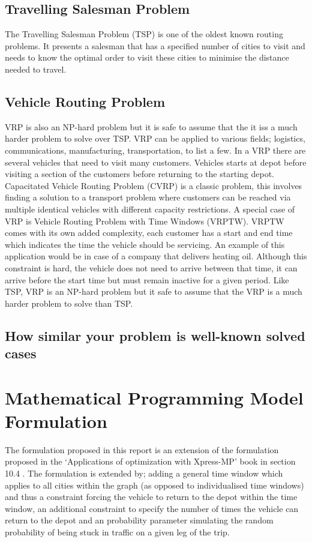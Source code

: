 \documentclass[a4paper,11pt]{article}
\begin{document}
\subsection{Travelling Salesman Problem}
The Travelling Salesman Problem (TSP) is one of the oldest known routing problems. It presents a salesman that has a specified number of cities to visit and needs to know the optimal order to visit these cities to minimise the distance needed to travel.

\subsection{Vehicle Routing Problem}
VRP is also an NP-hard problem but it is safe to assume that the it iss a much harder problem to solve over TSP. VRP can be applied to various fields; logistics, communications, manufacturing, transportation, to list a few. In a VRP there are several vehicles that need to visit many customers. Vehicles starts at depot before visiting a section of the customers before returning to the starting depot. 
Capacitated Vehicle Routing Problem (CVRP) is a classic problem, this involves finding a solution to a transport problem where customers can be reached via multiple identical vehicles with different capacity restrictions. 
A special case of VRP is Vehicle Routing Problem with Time Windows (VRPTW). VRPTW comes with its own added complexity, each customer has a start and end time which indicates the time the vehicle should be servicing. An example of this application would be in case of a company that delivers heating oil. Although this constraint is hard, the vehicle does not need to arrive between that time, it can arrive before the start time but must remain inactive for a given period. 
Like TSP, VRP is an NP-hard problem \cite{lenstra1981complexity} but it safe to assume that the VRP is a much harder problem to solve than TSP. 


\subsection{How similar your problem is well-known solved cases}
\section{Mathematical Programming Model Formulation}

The formulation proposed in this report is an extension of the formulation proposed in the `Applications of optimization with Xpress-MP' book in section 10.4 \cite{gueret1999applications}. The formulation is extended by; adding a general time window which applies to all cities within the graph (as opposed to individualised time windows) and thus a constraint forcing the vehicle to return to the depot within the time window, an additional constraint to specify the number of times the vehicle can return to the depot and an probability parameter simulating the random probability of being stuck in traffic on a given leg of the trip.
\end{document}
